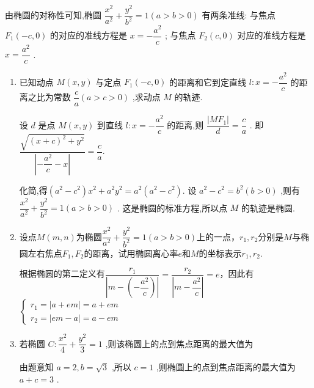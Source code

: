 由椭圆的对称性可知,椭圆 $\dfrac{{x}^{2}}{{a}^{2}} + \dfrac{{y}^{2}}{{b}^{2}} = 1\left( {a > b > 0}\right)$ 有两条准线: 与焦点 ${F}_{1}\left( {-c,0}\right)$ 的对应的准线方程是 $x =  - \dfrac{{a}^{2}}{c}$ ; 与焦点 ${F}_{2}\left( {c,0}\right)$ 对应的准线方程是 $x = \dfrac{{a}^{2}}{c}$ .
\begin{enumerate}
    \item 已知动点 $M\left( {x,y}\right)$ 与定点 ${F}_{1}\left( {-c,0}\right)$ 的距离和它到定直线 $l : x =  - \dfrac{{a}^{2}}{c}$ 的距离之比为常数 $\dfrac{c}{a}\left( {a > c > 0}\right)$ ,求动点 $M$ 的轨迹.
    \begin{jieda}
        设 $d$ 是点 $M\left( {x,y}\right)$ 到直线 $l : x =  - \dfrac{{a}^{2}}{c}$ 的距离,则 $\dfrac{\left| M{F}_{1}\right| }{d} = \dfrac{c}{a}$ .
        即$\dfrac{\sqrt{{\left( x + c\right) }^{2} + {y}^{2}}}{\left| -\dfrac{{a}^{2}}{c} - x\right| } = \dfrac{c}{a}.$
        
        化简,得$\left( {{a}^{2} - {c}^{2}}\right) {x}^{2} + {a}^{2}{y}^{2} = {a}^{2}\left( {{a}^{2} - {c}^{2}}\right) .$ 设 ${a}^{2} - {c}^{2} = {b}^{2}\left( {b > 0}\right)$ ,则有 $\dfrac{{x}^{2}}{{a}^{2}} + \dfrac{{y}^{2}}{{b}^{2}} = 1\left( {a > b > 0}\right)$ . 这是椭圆的标准方程,所以点 $M$ 的轨迹是椭圆.
    \end{jieda}
    
    \item 设点$M(m, n)$为椭圆$\dfrac{x^2}{a^2}+\dfrac{y^2}{b^2} = 1(a>b>0)$上的一点，$r_1, r_2$分别是$M$与椭圆左右焦点$F_1, F_2$的距离，试用椭圆离心率$e$和$M$的坐标表示$r_1, r_2$.
    \begin{jieda}
        根据椭圆的第二定义有$\dfrac{r_1}{\left|m - \left(-\dfrac{a^2}{c}\right)\right|} = \dfrac{r_2}{\left|m - \dfrac{a^2}{c}\right|} = e$，因此有$\left\{\begin{array}{l}
             r_1 = |a+em| = a+em \\
             r_2 = |em-a| = a-em
        \end{array}\right.$
    \end{jieda}

    \item 若椭圆 $C : \dfrac{{x}^{2}}{4} + \dfrac{{y}^{2}}{3} = 1$ ,则该椭圆上的点到焦点距离的最大值为
    \begin{jieda}
        由题意知 $a = 2,b = \sqrt{3}$ ,所以 $c = 1$ ,则椭圆上的点到焦点距离的最大值为 $a + c = 3$ .
    \end{jieda}
    

\end{enumerate}
